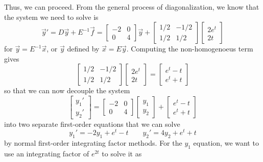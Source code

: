 \documentclass{ximera}
\begin{document}
\begin{exampleSol}
Thus, we can proceed. From the general process of diagonalization, we know that the system we need to solve is
\begin{equation*}
    \vec{y}' = D\vec{y} + E^{-1}\vec{f} = \begin{bmatrix} -2 & 0 \\ 0 & 4 \end{bmatrix} \vec{y} + \begin{bmatrix} 1/2 & -1/2 \\ 1/2 & 1/2 \end{bmatrix} \begin{bmatrix} 2e^t \\ 2t \end{bmatrix}
\end{equation*}
for $\vec{y} = E^{-1}\vec{x}$, or $\vec{y}$ defined by $\vec{x} = E\vec{y}$. Computing the non-homogenoeus term gives
\begin{equation*}
    \begin{bmatrix} 1/2 & -1/2 \\ 1/2 & 1/2 \end{bmatrix} \begin{bmatrix} 2e^t \\ 2t \end{bmatrix} = \begin{bmatrix} e^t - t \\ e^t + t \end{bmatrix}
\end{equation*}
so that we can now decouple the system
\begin{equation*}
    \begin{bmatrix} y_1' \\ y_2' \end{bmatrix}  = \begin{bmatrix} -2 & 0 \\ 0 & 4 \end{bmatrix} \begin{bmatrix} y_1 \\ y_2 \end{bmatrix} + \begin{bmatrix} e^t - t \\ e^t + t \end{bmatrix}
\end{equation*}
into two separate first-order equations that we can solve
\begin{equation*}
    y_1' = -2y_1 + e^t - t \qquad y_2' = 4y_2 + e^t + t
\end{equation*}
by normal first-order integrating factor methods. For the $y_1$ equation, we want to use an integrating factor of $e^{2t}$ to solve it as

\end{exampleSol}
\end{document}
